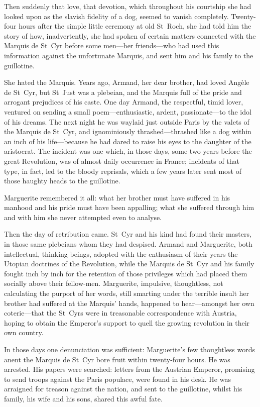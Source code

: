 Then suddenly that love, that devotion, which throughout his courtship she had looked upon as the slavish fidelity of a dog, seemed to vanish completely. Twenty-four hours after the simple little ceremony at old St~Roch, she had told him the story of how, inadvertently, she had spoken of certain matters connected with the Marquis de St~Cyr before some men---her friends---who had used this information against the unfortunate Marquis, and sent him and his family to the guillotine.

She hated the Marquis. Years ago, Armand, her dear brother, had loved Angèle de St~Cyr, but St~Just was a plebeian, and the Marquis full of the pride and arrogant prejudices of his caste. One day Armand, the respectful, timid lover, ventured on sending a small poem---enthusiastic, ardent, passionate---to the idol of his dreams. The next night he was waylaid just outside Paris by the valets of the Marquis de St~Cyr, and ignominiously thrashed---thrashed like a dog within an inch of his life---because he had dared to raise his eyes to the daughter of the aristocrat. The incident was one which, in those days, some two years before the great Revolution, was of almost daily occurrence in France; incidents of that type, in fact, led to the bloody reprisals, which a few years later sent most of those haughty heads to the guillotine.

Marguerite remembered it all: what her brother must have suffered in his manhood and his pride must have been appalling; what she suffered through him and with him she never attempted even to analyse.

Then the day of retribution came. St~Cyr and his kind had found their masters, in those same plebeians whom they had despised. Armand and Marguerite, both intellectual, thinking beings, adopted with the enthusiasm of their years the Utopian doctrines of the Revolution, while the Marquis de St~Cyr and his family fought inch by inch for the retention of those privileges which had placed them socially above their fellow-men. Marguerite, impulsive, thoughtless, not calculating the purport of her words, still smarting under the terrible insult her brother had suffered at the Marquis’ hands, happened to hear---amongst her own coterie---that the St~Cyrs were in treasonable correspondence with Austria, hoping to obtain the Emperor's support to quell the growing revolution in their own country.

In those days one denunciation was sufficient: Marguerite's few thoughtless words anent the Marquis de St~Cyr bore fruit within twenty-four hours. He was arrested. His papers were searched: letters from the Austrian Emperor, promising to send troops against the Paris populace, were found in his desk. He was arraigned for treason against the nation, and sent to the guillotine, whilst his family, his wife and his sons, shared this awful fate.

